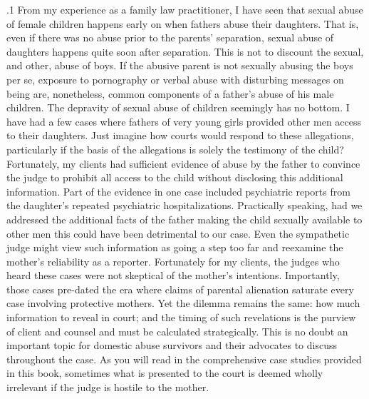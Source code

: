 \documentclass[11pt, twoside]{article}
\begin{document}
{\p.1{%
From my experience as a family law practitioner, I have seen that sexual abuse of female children happens early on when fathers abuse their
daughters. That is, even if there was no abuse prior to the parents' separation, sexual abuse of daughters happens quite soon after separation.
This is not to discount the sexual, and other, abuse of boys. If the abusive
parent is not sexually abusing the boys per se, exposure to pornography
or verbal abuse with disturbing messages on being  are, nonetheless, common components of a father's abuse of his male children. The
depravity of sexual abuse of children seemingly has no bottom. I have
had a few cases where fathers of very young girls provided other men
access to their daughters. Just imagine how courts would respond to
these allegations, particularly if the basis of the allegations is solely the
testimony of the child? Fortunately, my clients had sufficient evidence
of abuse by the father to convince the judge to prohibit all access to the
child without disclosing this additional information. Part of the evidence
in one case included psychiatric reports from the daughter's repeated
psychiatric hospitalizations. Practically speaking, had we addressed the
additional facts of the father making the child sexually available to other
men this could have been detrimental to our case. Even the sympathetic
judge might view such information as going a step too far and reexamine the mother's reliability as a reporter. Fortunately for my clients,
the judges who heard these cases were not skeptical of the mother's
intentions. Importantly, those cases pre-dated the era where claims of
parental alienation saturate every case involving protective mothers. Yet
the dilemma remains the same: how much information to reveal in court;
and the timing of such revelations is the purview of client and counsel
and must be calculated strategically. This is no doubt an important topic
for domestic abuse survivors and their advocates to discuss throughout
the case. As you will read in the comprehensive case studies provided in
this book, sometimes what is presented to the court is deemed wholly
irrelevant if the judge is hostile to the mother.
}%

}
\end{document}
